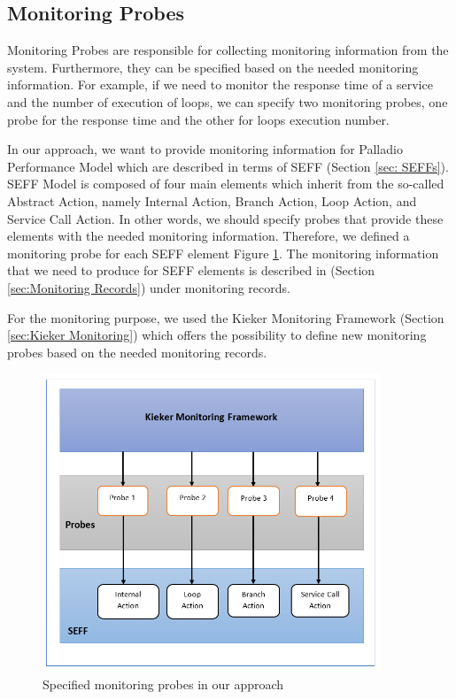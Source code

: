 \subsection{Monitoring Probes}
\label{sec:Monitoring Probes}
Monitoring Probes are responsible for collecting monitoring information from the system. Furthermore, they can be specified based on the needed monitoring information. For example, if we need to monitor the response time of a service and the number of execution of loops, we can specify two monitoring probes, one probe for the response time and the other for loops execution number. 

In our approach, we want to provide monitoring information for Palladio Performance Model which are described in terms of SEFF (Section \ref{sec: SEFFs}).   SEFF Model is composed of four main elements which inherit from the so-called Abstract Action, namely Internal Action, Branch Action, Loop Action, and Service Call Action. In other words, we should specify probes that provide these elements with the needed monitoring information. Therefore, we defined a monitoring probe for each SEFF element Figure \ref{fig:Specified Monitoring Probes in our Approach}. The monitoring information that we need to produce for SEFF elements is described in (Section \ref{sec:Monitoring Records}) under monitoring records.  

For the monitoring purpose, we used the Kieker Monitoring Framework (Section \ref{sec:Kieker Monitoring}) which offers the possibility to define new monitoring probes based on the needed monitoring records.

\begin{figure}[h]
\centering
\includegraphics[width=0.9\textwidth]{figures/probes}
\caption{Specified monitoring probes in our approach}
\label{fig:Specified Monitoring Probes in our Approach}
\end{figure}

